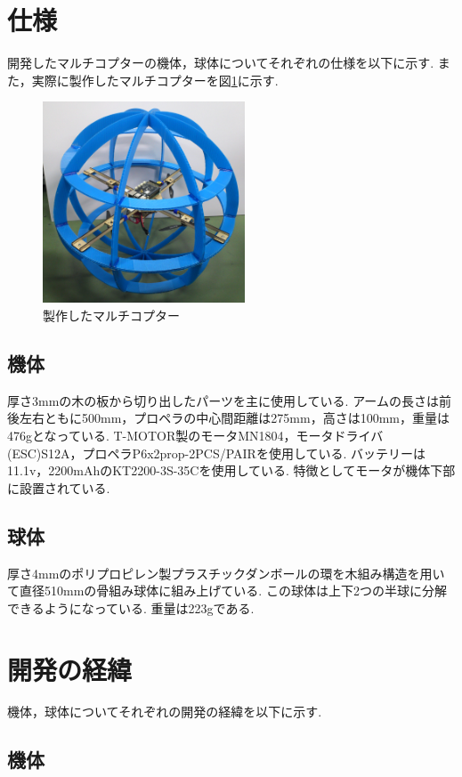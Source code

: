 \documentclass[12pt,oneside]{sotsuken_paper}
\begin{document}
\section{仕様}
開発したマルチコプターの機体，球体についてそれぞれの仕様を以下に示す.
また，実際に製作したマルチコプターを図\ref{fig:multicopter}に示す.

\begin{figure}[htbp]
	\begin{center}
		\includegraphics[width=60mm]{image/multicopter.jpg}
		\caption{製作したマルチコプター}
		\label{fig:multicopter}
	\end{center}
\end{figure}

\subsection{機体}
厚さ3mmの木の板から切り出したパーツを主に使用している.
アームの長さは前後左右ともに500mm，プロペラの中心間距離は275mm，高さは100mm，重量は476gとなっている.
T-MOTOR製のモータMN1804，モータドライバ(ESC)S12A，プロペラP6x2prop-2PCS/PAIRを使用している.
バッテリーは11.1v，2200mAhのKT2200-3S-35Cを使用している.
特徴としてモータが機体下部に設置されている.

\subsection{球体}
厚さ4mmのポリプロピレン製プラスチックダンボールの環を木組み構造を用いて直径510mmの骨組み球体に組み上げている.
この球体は上下2つの半球に分解できるようになっている.
重量は223gである.

\section{開発の経緯}
機体，球体についてそれぞれの開発の経緯を以下に示す.

\subsection{機体}
\end{document}
